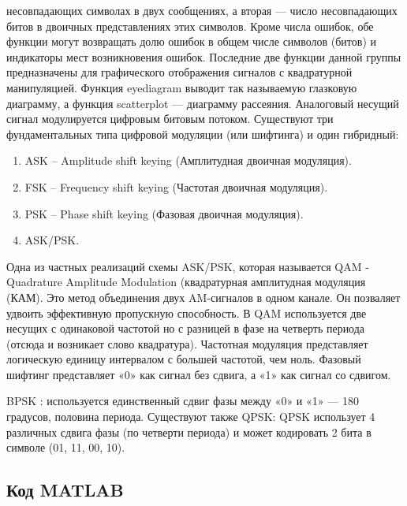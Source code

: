 \documentclass[10pt,a4paper]{article}
\begin{document}
несовпадающих символах в двух сообщениях, а вторая — число несовпадающих битов в двоичных представлениях этих символов. Кроме числа ошибок, обе функции могут возвращать долю ошибок в общем числе символов (битов) и индикаторы мест возникновения ошибок. 
Последние две функции данной группы предназначены для графического отображения сигналов с квадратурной манипуляцией. Функция eyediagram выводит так называемую глазковую диаграмму, а функция scatterplot — диаграмму рассеяния. 
Аналоговый несущий сигнал модулируется цифровым битовым потоком.
Существуют три фундаментальных типа цифровой модуляции (или шифтинга) и один гибридный:
\begin{enumerate}
    \item ASK – Amplitude shift keying (Амплитудная двоичная модуляция).
    \item FSK – Frequency shift keying (Частотая двоичная модуляция).
    \item PSK – Phase shift keying (Фазовая двоичная модуляция).
    \item ASK/PSK.
\end{enumerate}
Одна из частных реализаций схемы ASK/PSK, которая называется QAM - Quadrature Amplitude Modulation (квадратурная амплитудная модуляция (КАМ). Это метод объединения двух AM-сигналов в одном канале. Он позваляет удвоить эффективную пропускную способность. В QAM используется две несущих с одинаковой частотой но с разницей в фазе на четверть периода (отсюда и возникает слово квадратура). 
Частотная модуляция представляет логическую единицу интервалом с большей частотой, чем ноль.
Фазовый шифтинг представляет «0» как сигнал без сдвига, а «1» как сигнал со сдвигом.

BPSK : используется единственный сдвиг фазы между «0» и «1» — 180 градусов, половина периода.
Существуют также QPSK:
QPSK использует 4 различных сдвига фазы (по четверти периода) и может кодировать 2 бита в символе (01, 11, 00, 10). 
\subsection{Код MATLAB}
\end{document}
